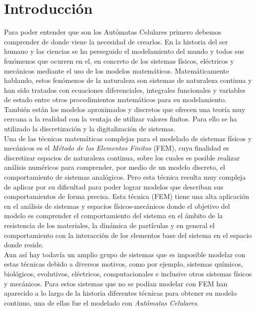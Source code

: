 
\section{Introducción} %

%

Para poder entender que son los Autómatas Celulares primero debemos comprender de donde viene la necesidad de crearlos. En la historia del ser humano y las ciencias se ha perseguido el modelamiento del mundo y todos sus fenómenos que ocurren en el, en concreto de los sistemas físicos, eléctricos y mecánicos mediante el uso de los modelos matemáticos. Matemáticamente hablando, estos fenómenos de la naturaleza son sistemas de naturaleza continua y han sido tratados con ecuaciones diferenciales, integrales funcionales y variables de estado entre otros procedimientos matemáticos para su modelamiento. También están los modelos aproximados y discretos que ofrecen una teoría muy cercana a la realidad con la ventaja de utilizar valores finitos. Para ello se ha utilizado la discretización y la digitalización de sistemas.\\

Una de las técnicas matemáticas complejas para el modelado de sistemas físicos y mecánicos es el \textit{Método de los Elementos Finitos} (FEM), cuya finalidad es discretizar espacios de naturaleza continua, sobre los cuales es posible realizar análisis numéricos para comprender, por medio de un modelo discreto, el comportamiento de sistemas analógicos. Pero esta técnica resulta muy compleja de aplicar por su dificultad para poder lograr modelos que describan sus comportamientos de forma precisa. Esta técnica (FEM) tiene una alta aplicación en el análisis de sistemas y espacios físicos-mecánicos donde el objetivo del modelo es comprender el comportamiento del sistema en el ámbito de la resistencia de los materiales, la dinámica de partículas y en general el comportamiento con la interacción  de los elementos base del sistema en el espacio donde reside.\\

Aun así hay todavía un amplio grupo de sistemas que es imposible modelar con estas técnicas debido a diversos motivos, como por ejemplo, sistemas químicos, biológicos, evolutivos, eléctricos, computacionales e inclusive otros sistemas físicos y mecánicos. Para estos sistemas que no se podían modelar con FEM han aparecido a lo largo de la historia diferentes técnicas para obtener su modelo continuo, una de ellas fue el modelado con \textit{Autómatas Celulares}.




